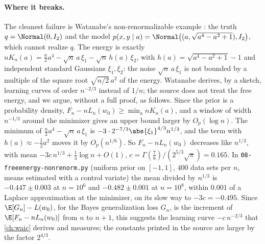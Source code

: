 \begin{refsection}
\paragraph{Where it breaks.} The cleanest failure is Watanabe's non-renormalizable example \parencite[\S5]{Watanabe2010d}: the truth $q=\Normal(0,I_2)$ and the model $p(x,y\mid a)=\Normal\bigl((a,\sqrt{a^4-a^2+1}),I_2\bigr)$, which cannot realize $q$. The energy is exactly $nK_n(a)=\frac n2a^4-\sqrt n\,a\,\xi_1-\sqrt n\,h(a)\,\xi_2$, with $h(a)=\sqrt{a^4-a^2+1}-1$ and independent standard Gaussians $\xi_1,\xi_2$: the noise $\sqrt n\,a\,\xi_1$ is not bounded by a multiple of the square root $\sqrt{n/2}\,a^2$ of the energy. Watanabe derives, by a sketch, learning curves of order $n^{-2/3}$ instead of $1/n$; the source does not treat the free energy, and we argue, without a full proof, as follows. Since the prior is a probability density, $F_n-nL_n(w_0)\ge\min_anK_n(a)$, and a window of width $n^{-1/3}$ around the minimizer gives an upper bound larger by $O_p(\log n)$. The minimum of $\frac n2a^4-\sqrt n\,a\,\xi_1$ is $-3\cdot2^{-7/3}\abs{\xi_1}^{4/3}n^{1/3}$, and the term with $h(a)\approx-\frac12a^2$ moves it by $O_p(n^{1/6})$. So $F_n-nL_n(w_0)$ decreases like $n^{1/3}$, with mean $-3c\,n^{1/3}+\frac13\log n+O(1)$, $c=\Gamma(\frac76)/(2^{5/3}\sqrt\pi)=0.165$. In \texttt{08-freeenergy-nonrenorm.py} (uniform prior on $[-1,1]$, $400$ data sets per $n$, means estimated with a control variate) the mean divided by $n^{1/3}$ is $-0.447\pm0.003$ at $n=10^6$ and $-0.482\pm0.001$ at $n=10^8$, within $0.001$ of a Laplace approximation at the minimizer, on its slow way to $-3c=-0.495$. Since $\E[G_n]-L(w_0)$, for the Bayes generalization loss $G_n$, is the increment of $\E[F_n-nL_n(w_0)]$ from $n$ to $n+1$, this suggests the learning curve $-c\,n^{-2/3}$ that \cref{ch:waic} derives and measures; the constants printed in the source are larger by the factor $2^{4/3}$.


\end{refsection}
